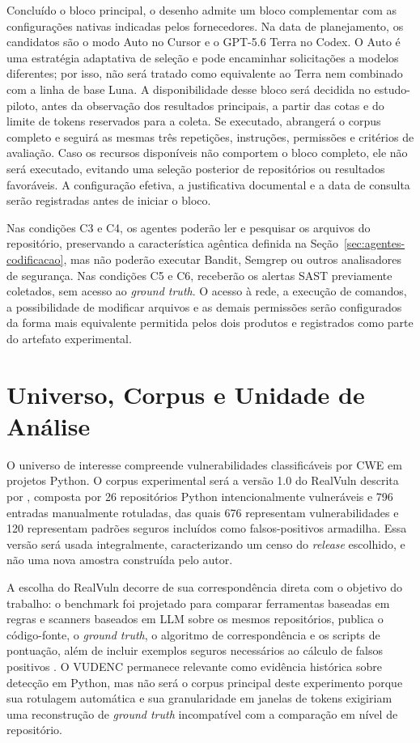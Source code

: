 Concluído o bloco principal, o desenho admite um bloco complementar com as configurações nativas indicadas pelos fornecedores. Na data de planejamento, os candidatos são o modo Auto no Cursor e o GPT-5.6 Terra no Codex. O Auto é uma estratégia adaptativa de seleção e pode encaminhar solicitações a modelos diferentes; por isso, não será tratado como equivalente ao Terra nem combinado com a linha de base Luna. A disponibilidade desse bloco será decidida no estudo-piloto, antes da observação dos resultados principais, a partir das cotas e do limite de tokens reservados para a coleta. Se executado, abrangerá o corpus completo e seguirá as mesmas três repetições, instruções, permissões e critérios de avaliação. Caso os recursos disponíveis não comportem o bloco completo, ele não será executado, evitando uma seleção posterior de repositórios ou resultados favoráveis. A configuração efetiva, a justificativa documental e a data de consulta serão registradas antes de iniciar o bloco.

Nas condições C3 e C4, os agentes poderão ler e pesquisar os arquivos do repositório, preservando a característica agêntica definida na Seção~\ref{sec:agentes-codificacao}, mas não poderão executar Bandit, Semgrep ou outros analisadores de segurança. Nas condições C5 e C6, receberão os alertas SAST previamente coletados, sem acesso ao \textit{ground truth}. O acesso à rede, a execução de comandos, a possibilidade de modificar arquivos e as demais permissões serão configurados da forma mais equivalente permitida pelos dois produtos e registrados como parte do artefato experimental.

\section{Universo, Corpus e Unidade de Análise}\label{sec:universo-amostra}

O universo de interesse compreende vulnerabilidades classificáveis por CWE em projetos Python. O corpus experimental será a versão 1.0 do RealVuln descrita por , composta por 26 repositórios Python intencionalmente vulneráveis e 796 entradas manualmente rotuladas, das quais 676 representam vulnerabilidades e 120 representam padrões seguros incluídos como falsos-positivos armadilha. Essa versão será usada integralmente, caracterizando um censo do \textit{release} escolhido, e não uma nova amostra construída pelo autor.

A escolha do RealVuln decorre de sua correspondência direta com o objetivo do trabalho: o benchmark foi projetado para comparar ferramentas baseadas em regras e scanners baseados em LLM sobre os mesmos repositórios, publica o código-fonte, o \textit{ground truth}, o algoritmo de correspondência e os scripts de pontuação, além de incluir exemplos seguros necessários ao cálculo de falsos positivos \cite{Pellew2026RealVuln}. O VUDENC permanece relevante como evidência histórica sobre detecção em Python, mas não será o corpus principal deste experimento porque sua rotulagem automática e sua granularidade em janelas de tokens exigiriam uma reconstrução de \textit{ground truth} incompatível com a comparação em nível de repositório.

